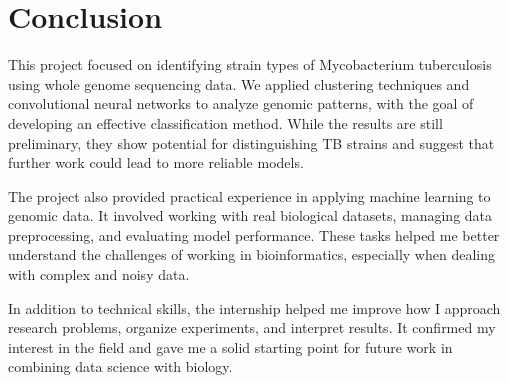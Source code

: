 \chapter{Conclusion}
\label{chap:conclusion}

This project focused on identifying strain types of Mycobacterium tuberculosis using whole genome sequencing data.
We applied clustering techniques and convolutional neural networks to analyze genomic patterns, with the goal of
developing an effective classification method. While the results are still preliminary, they show potential for
distinguishing TB strains and suggest that further work could lead to more reliable models.

The project also provided practical experience in applying machine learning to genomic data. It involved working
with real biological datasets, managing data preprocessing, and evaluating model performance. These tasks helped
me better understand the challenges of working in bioinformatics, especially when dealing with complex and noisy
data.

In addition to technical skills, the internship helped me improve how I approach research problems, organize
experiments, and interpret results. It confirmed my interest in the field and gave me a solid starting point
for future work in combining data science with biology.